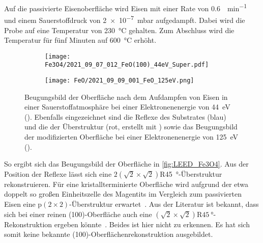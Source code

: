         Auf die passivierte Eisenoberfläche wird Eisen mit einer Rate von \SI{0.6}{\ML\per\minute} und einem Sauerstoffdruck von \SI{2e-7}{\milli\bar} aufgedampft.
        Dabei wird die Probe auf eine Temperatur von \SI{230}{\celsius} gehalten.
        Zum Abschluss wird die Temperatur für fünf Minuten auf \SI{600}{\celsius} erhöht.
        \begin{figure}
            \begin{subfigure}[t]{0.48\textwidth}
                \centering
                \texttt{[image: Fe3O4/2021\_09\_07\_012\_FeO(100)\_44eV\_Super.pdf]}
                \subcaption{}
                \label{fig:LEED_Fe3O4}
            \end{subfigure}
            \begin{subfigure}[t]{0.48\textwidth}
                \centering
                \texttt{[image: FeO/2021\_09\_09\_001\_FeO\_125eV.png]}
                \subcaption{}
                \label{fig:LEED_FeO}
            \end{subfigure}
            \caption{Beugungsbild der Oberfläche nach dem Aufdampfen von Eisen in einer Sauerstoffatmosphäre bei einer Elektronenenergie von \SI{44}{\electronvolt} ().
            Ebenfalls eingezeichnet sind die Reflexe des Substrates (blau) und die der Überstruktur (rot, erstellt mit \cite{SpotPlotter}) sowie das Beugungsbild der modifizierten Oberfläche bei einer Elektronenenergie von \SI{125}{\electronvolt} ().}
        \end{figure}
        So ergibt sich das Beugungsbild der Oberfläche in \autoref{fig:LEED_Fe3O4}.
        Aus der Position der Reflexe lässt sich eine $2\left(\sqrt{2}\times\sqrt{2}\right)$R\SI{45}{\degree}-Überstruktur rekonstruieren.
        Für eine kristallterminierte Oberfläche wird aufgrund der etwa doppelt so großen Einheitszelle des Magentits im Vergleich zum passivierten Eisen eine p$(2\times2)$-Überstruktur erwartet~\cite{FeO_1}.
        Aus der Literatur ist bekannt, dass sich bei einer reinen  (100)-Oberfläche auch eine $\left(\sqrt{2}\times\sqrt{2}\right)\text{R}\SI{45}{\degree}$-Rekonstruktion ergeben könnte~\cite{ruwisch_vsm-untersuchung_2016}.
        Beides ist hier nicht zu erkennen.
        Es hat sich somit keine bekannte  (100)-Oberflächenrekonstruktion ausgebildet.

